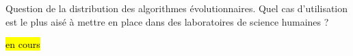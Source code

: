 Question de la distribution des algorithmes évolutionnaires. Quel cas d'utilisation est le plus aisé à mettre en place dans des laboratoires de science humaines ?

\hl{en cours}













